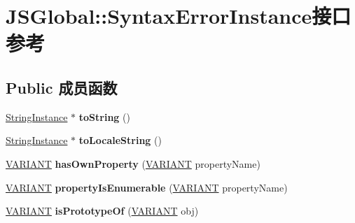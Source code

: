\hypertarget{interface_j_s_global_1_1_syntax_error_instance}{}\section{J\+S\+Global\+:\+:Syntax\+Error\+Instance接口 参考}
\label{interface_j_s_global_1_1_syntax_error_instance}
\subsection*{Public 成员函数}
\begin{DoxyCompactItemize}
\item 
\mbox{\label{interface_j_s_global_1_1_syntax_error_instance_af8f94de4a84c51e06748ae7b6ebabb89}} 
\hyperlink{interface_j_s_global_1_1_string_instance}{String\+Instance} $\ast$ {\bfseries to\+String} ()
\item 
\mbox{\label{interface_j_s_global_1_1_syntax_error_instance_a74801b4ce012a189193d320da2b951e2}} 
\hyperlink{interface_j_s_global_1_1_string_instance}{String\+Instance} $\ast$ {\bfseries to\+Locale\+String} ()
\item 
\mbox{\label{interface_j_s_global_1_1_syntax_error_instance_aada27c4de5b015f831da233bf9326ab1}} 
\hyperlink{structtag_v_a_r_i_a_n_t}{V\+A\+R\+I\+A\+NT} {\bfseries has\+Own\+Property} (\hyperlink{structtag_v_a_r_i_a_n_t}{V\+A\+R\+I\+A\+NT} property\+Name)
\item 
\mbox{\label{interface_j_s_global_1_1_syntax_error_instance_a47790b277add9621414954f094bb380e}} 
\hyperlink{structtag_v_a_r_i_a_n_t}{V\+A\+R\+I\+A\+NT} {\bfseries property\+Is\+Enumerable} (\hyperlink{structtag_v_a_r_i_a_n_t}{V\+A\+R\+I\+A\+NT} property\+Name)
\item 
\mbox{\label{interface_j_s_global_1_1_syntax_error_instance_a5a4f625f7edaee050cd5f39e8d3ba8d5}} 
\hyperlink{structtag_v_a_r_i_a_n_t}{V\+A\+R\+I\+A\+NT} {\bfseries is\+Prototype\+Of} (\hyperlink{structtag_v_a_r_i_a_n_t}{V\+A\+R\+I\+A\+NT} obj)
\end{DoxyCompactItemize}
